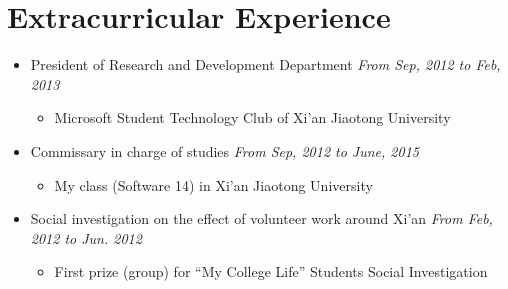 \documentclass[a4paper,11pt]{article}
\begin{document}
\section{Extracurricular Experience}

\begin{itemize}
    \item President of Research and Development Department \hfill \textit{From Sep, 2012 to Feb, 2013}
    \begin{itemize}
        \item Microsoft Student Technology Club of Xi’an Jiaotong University
    \end{itemize}

    \item Commissary in charge of studies \hfill \textit{From Sep, 2012 to June, 2015}
    \begin{itemize}
        \item My class (Software 14) in Xi’an Jiaotong University
    \end{itemize}

    \item Social investigation on the effect of volunteer work around Xi’an \hfill \textit{From Feb, 2012 to
Jun. 2012}
    \begin{itemize}
        \item First prize (group) for ``My College Life'' Students Social Investigation
    \end{itemize}

\end{itemize}



\end{document}
